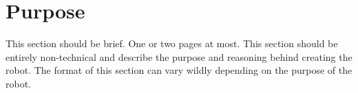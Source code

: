
\chapter{Purpose}
\label{chap:purpose}

This section should be brief. One or two pages at most. This section should be entirely non-technical and describe the purpose and reasoning behind creating the robot. The format of this section can vary wildly depending on the purpose of the robot.
